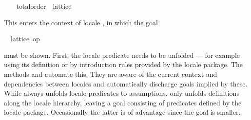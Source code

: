 \begin{isabellebody}
\ \ %
\endisadelimvisible
%
\isatagvisible
{}\isamarkupfalse%
\ total{\isacharunderscore}order\ {\isasymsubseteq}\ lattice%
\begin{isamarkuptxt}%
This enters the context of locale , in
  which the goal \begin{isabelle}%
\ {}{\isachardot}\ lattice\ op\ {\isasymsqsubseteq}%
\end{isabelle} must be shown.  First, the
  locale predicate needs to be unfolded --- for example using its
  definition or by introduction rules
  provided by the locale package.  The methods 
  and  automate this.  They are aware of the
  current context and dependencies between locales and automatically
  discharge goals implied by these.  While 
  always unfolds locale predicates to assumptions,  only unfolds definitions along the locale
  hierarchy, leaving a goal consisting of predicates defined by the
  locale package.  Occasionally the latter is of advantage since the goal
  is smaller.


\end{isamarkuptxt}
\end{isabellebody}
